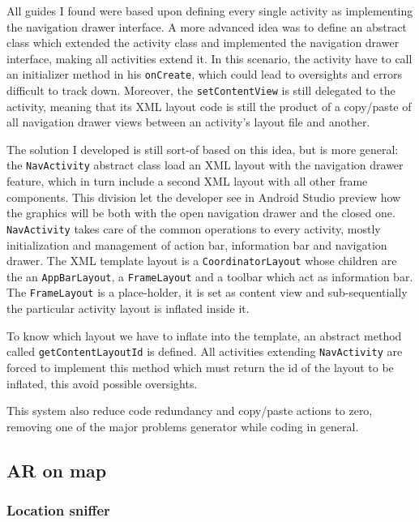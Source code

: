 			All guides I found were based upon defining every single activity as implementing the navigation drawer interface.
			A more advanced idea was to define an abstract class which extended the activity class and implemented the navigation drawer interface, making all activities extend it.
			In this scenario, the activity have to call an initializer method in his \lstinline|onCreate|, which could lead to oversights and errors difficult to track down. Moreover, the \lstinline|setContentView| is still delegated to the activity, meaning that its XML layout code is still the product of a copy/paste of all navigation drawer views between an activity's layout file and another.
			
			The solution I developed is still sort-of based on this idea, but is more general: the \lstinline|NavActivity| abstract class load an XML layout with the navigation drawer feature, which in turn include a second XML layout with all other frame components.
			This division let the developer see in Android Studio preview how the graphics will be both with the open navigation drawer and the closed one.
			\lstinline|NavActivity| takes care of the common operations to every activity, mostly initialization and management of action bar, information bar and navigation drawer.
			The XML template layout is a \lstinline|CoordinatorLayout| whose children are the an \lstinline|AppBarLayout|, a \lstinline|FrameLayout| and a toolbar which act as information bar.
			The \lstinline|FrameLayout| is a place-holder, it is set as content view and sub-sequentially the particular activity layout is inflated inside it.
			
			To know which layout we have to inflate into the template, an abstract method called \lstinline|getContentLayoutId| is defined.
			All activities extending \lstinline|NavActivity| are forced to implement this method which must return the id of the layout to be inflated, this avoid possible oversights.
			
			This system also reduce code redundancy and copy/paste actions to zero, removing one of the major problems generator while coding in general.
		
		\subsection{AR on map}\label{focus:map}
		
			\subsubsection{Location sniffer}
			
